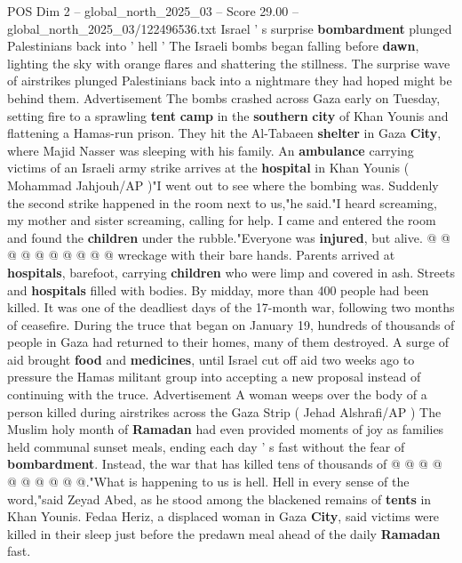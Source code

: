 \begin{textsample}{POS Dim 2 – global\_north\_2025\_03 – Score 29.00 – global\_north\_2025\_03/122496536.txt}  \label{ex:f2_pos_404}
Israel ' s surprise \textbf{bombardment} plunged Palestinians back into ' hell ' The Israeli bombs began falling before \textbf{dawn}, lighting the sky with orange flares and shattering the stillness.
The surprise wave of airstrikes plunged Palestinians back into a nightmare they had hoped might be behind them.
Advertisement The bombs crashed across Gaza early on Tuesday, setting fire to a sprawling \textbf{tent} \textbf{camp} in the \textbf{southern} \textbf{city} of Khan Younis and flattening a Hamas-run prison.
They hit the Al-Tabaeen \textbf{shelter} in Gaza \textbf{City}, where Majid Nasser was sleeping with his family.
An \textbf{ambulance} carrying victims of an Israeli army strike arrives at the \textbf{hospital} in Khan Younis ( Mohammad Jahjouh/AP )"I went out to see where the bombing was.
Suddenly the second strike happened in the room next to us,"he said."I heard screaming, my mother and sister screaming, calling for help.
I came and entered the room and found the \textbf{children} under the rubble."Everyone was \textbf{injured}, but alive. @ @ @ @ @ @ @ @ @ @ wreckage with their bare hands.
Parents arrived at \textbf{hospitals}, barefoot, carrying \textbf{children} who were limp and covered in ash.
Streets and \textbf{hospitals} filled with bodies.
By midday, more than 400 people had been killed.
It was one of the deadliest days of the 17-month war, following two months of ceasefire.
During the truce that began on January 19, hundreds of thousands of people in Gaza had returned to their homes, many of them destroyed.
A surge of aid brought \textbf{food} and \textbf{medicines}, until Israel cut off aid two weeks ago to pressure the Hamas militant group into accepting a new proposal instead of continuing with the truce.
Advertisement A woman weeps over the body of a person killed during airstrikes across the Gaza Strip ( Jehad Alshrafi/AP ) The Muslim holy month of \textbf{Ramadan} had even provided moments of joy as families held communal sunset meals, ending each day ' s fast without the fear of \textbf{bombardment}.
Instead, the war that has killed tens of thousands of @ @ @ @ @ @ @ @ @ @."What is happening to us is hell.
Hell in every sense of the word,"said Zeyad Abed, as he stood among the blackened remains of \textbf{tents} in Khan Younis.
Fedaa Heriz, a displaced woman in Gaza \textbf{City}, said victims were killed in their sleep just before the predawn meal ahead of the daily \textbf{Ramadan} fast.

\end{textsample}
